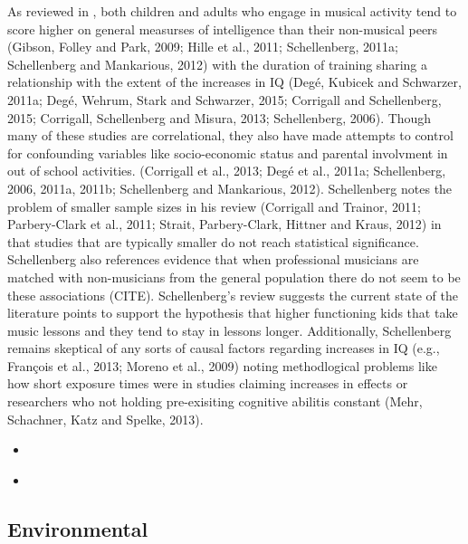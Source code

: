 \documentclass[]{book}
\providecommand{\tightlist}{%
  \setlength{\itemsep}{0pt}\setlength{\parskip}{0pt}}
\begin{document}
As reviewed in \citet{schellenbergMusicNonmusicalAbilities2017}, both children and adults who engage in musical activity tend to score higher on general measurses of intelligence than their non-musical peers (Gibson, Folley and Park, 2009; Hille et al., 2011; Schellenberg, 2011a; Schellenberg and Mankarious, 2012) with the duration of training sharing a relationship with the extent of the increases in IQ (Degé, Kubicek and Schwarzer, 2011a; Degé, Wehrum, Stark and Schwarzer, 2015; Corrigall and Schellenberg, 2015; Corrigall, Schellenberg and Misura, 2013; Schellenberg, 2006).
Though many of these studies are correlational, they also have made attempts to control for confounding variables like socio-economic status and parental involvment in out of school activities. (Corrigall et al., 2013; Degé et al., 2011a; Schellenberg, 2006, 2011a, 2011b; Schellenberg and Mankarious, 2012).
Schellenberg notes the problem of smaller sample sizes in his review (Corrigall and Trainor, 2011; Parbery-Clark et al., 2011; Strait, Parbery-Clark, Hittner and Kraus, 2012) in that studies that are typically smaller do not reach statistical significance.
Schellenberg also references evidence that when professional musicians are matched with non-musicians from the general population there do not seem to be these associations (CITE).
Schellenberg's review suggests the current state of the literature points to support the hypothesis that higher functioning kids that take music lessons and they tend to stay in lessons longer.
Additionally, Schellenberg remains skeptical of any sorts of causal factors regarding increases in IQ (e.g., François et al., 2013; Moreno et al., 2009) noting methodlogical problems like how short exposure times were in studies claiming increases in effects or researchers who not holding pre-exisiting cognitive abilitis constant (Mehr, Schachner, Katz and Spelke, 2013).

\begin{itemize}
\tightlist
\item
  \citep{corrigallMusicTrainingCognition2013}
\item
  \citep{swaminathanRevisitingAssociationMusic2017}
\end{itemize}

\hypertarget{environmental}{%
\subsection{Environmental}\label{environmental}}
\end{document}
